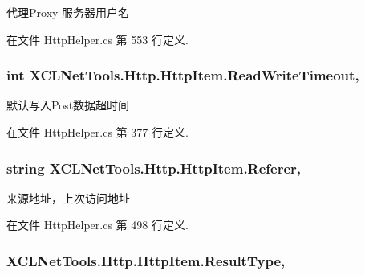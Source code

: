 代理\-Proxy 服务器用户名 



在文件 Http\-Helper.\-cs 第 553 行定义.

\hypertarget{class_x_c_l_net_tools_1_1_http_1_1_http_item_a5a3c4b7bd1d06a2965e29bae818e358b}{
\subsubsection[{Read\-Write\-Timeout}]{\setlength{\rightskip}{0pt plus 5cm}int X\-C\-L\-Net\-Tools.\-Http.\-Http\-Item.\-Read\-Write\-Timeout\hspace{0.3cm}{\ttfamily [get]}, {\ttfamily [set]}}}\label{class_x_c_l_net_tools_1_1_http_1_1_http_item_a5a3c4b7bd1d06a2965e29bae818e358b}


默认写入\-Post数据超时间 



在文件 Http\-Helper.\-cs 第 377 行定义.

\hypertarget{class_x_c_l_net_tools_1_1_http_1_1_http_item_acff06911fc5e2dd65812dc14c3960272}{
\subsubsection[{Referer}]{\setlength{\rightskip}{0pt plus 5cm}string X\-C\-L\-Net\-Tools.\-Http.\-Http\-Item.\-Referer\hspace{0.3cm}{\ttfamily [get]}, {\ttfamily [set]}}}\label{class_x_c_l_net_tools_1_1_http_1_1_http_item_acff06911fc5e2dd65812dc14c3960272}


来源地址，上次访问地址 



在文件 Http\-Helper.\-cs 第 498 行定义.

\hypertarget{class_x_c_l_net_tools_1_1_http_1_1_http_item_aacea6cef89d9f46a31ee98b4e6559860}{
\subsubsection[{Result\-Type}]{ X\-C\-L\-Net\-Tools.\-Http.\-Http\-Item.\-Result\-Type\hspace{0.3cm}{\ttfamily [get]}, {\ttfamily [set]}}}\label{class_x_c_l_net_tools_1_1_http_1_1_http_item_aacea6cef89d9f46a31ee98b4e6559860}


